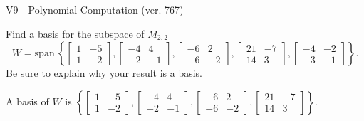 \begin{exercise}
  \begin{exerciseTitle}V9 - Polynomial Computation (ver. 767)\end{exerciseTitle}
  \begin{exerciseStatement}
    Find a basis for the subspace of \(M_{2,2}\) 
\[W=\mathrm{span}\ \left\{\left[\begin{array}{cc}
1 & -5 \\
1 & -2
\end{array}\right] , \left[\begin{array}{cc}
-4 & 4 \\
-2 & -1
\end{array}\right] , \left[\begin{array}{cc}
-6 & 2 \\
-6 & -2
\end{array}\right] , \left[\begin{array}{cc}
21 & -7 \\
14 & 3
\end{array}\right] , \left[\begin{array}{cc}
-4 & -2 \\
-3 & -1
\end{array}\right]\right\}.\]
 Be sure to explain why your result is a basis.


  \end{exerciseStatement}
  \begin{exerciseAnswer}
   A basis of \(W\) is  \(\left\{\left[\begin{array}{cc}
1 & -5 \\
1 & -2
\end{array}\right] , \left[\begin{array}{cc}
-4 & 4 \\
-2 & -1
\end{array}\right] , \left[\begin{array}{cc}
-6 & 2 \\
-6 & -2
\end{array}\right] , \left[\begin{array}{cc}
21 & -7 \\
14 & 3
\end{array}\right]\right\}\).
  


  \end{exerciseAnswer}
\end{exercise}